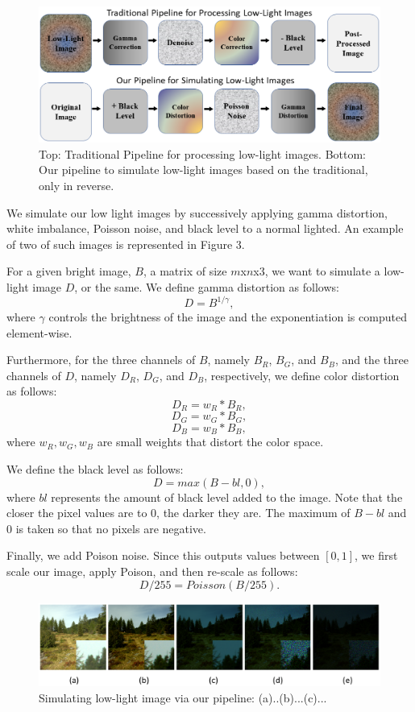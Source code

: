 \documentclass{article}
\begin{document}
\begin{figure}[ht]
  \centering
  \includegraphics[scale=0.35]{simulation_flowchart}
  \caption{Top: Traditional Pipeline for processing low-light images. Bottom: Our  pipeline to simulate low-light images based on the traditional, only in reverse.}
\end{figure}

We simulate our low light images by successively applying gamma distortion, white imbalance, Poisson noise, and black level to a normal lighted. An example of two of such images is represented in Figure 3. 

For a given bright image, \(B\), a matrix of size \(m\)x\(n\)x3, we want to simulate a low-light image \(D\), or the same. We define gamma distortion as follows:
\[   D = {B}^{1/\gamma}, \] 
where \(\gamma\) controls the brightness of the image and the exponentiation is computed element-wise.

Furthermore, for the three channels of \(B\), namely \(B_{R}\), \(B_{G}\), and \(B_{B}\), and the three channels of \(D\), namely \(D_{R}\), \(D_{G}\), and \(D_{B}\), respectively, we define color distortion as follows:
\[ D_{R} = w_{R}*B_{R},\]
\[ D_{G} = w_{G}*B_{G},\]
\[ D_{B} = w_{B}*B_{B},\]
where \(w_{R}, w_{G}, w_{B}\) are small weights that distort the color space.  

We define the black level as follows: 
\[  D = max(B-bl,0), \]
where \(bl\) represents the amount of black level added to the image. Note that the closer the pixel values are to 0, the darker they are. The maximum of \(B - bl\) and 0 is taken so that no pixels are negative. \newline

Finally, we add Poison noise. Since this outputs values between \([0, 1]\), we first scale our image, apply Poison, and then re-scale as follows:
\[  D/255 = Poisson(B/255). \]


\begin{figure}[ht]
  \centering
  \includegraphics[scale=0.3]{simulation_all}
  \caption{Simulating low-light image via our pipeline: (a)..(b)...(c)...}
\end{figure}
\end{document}
